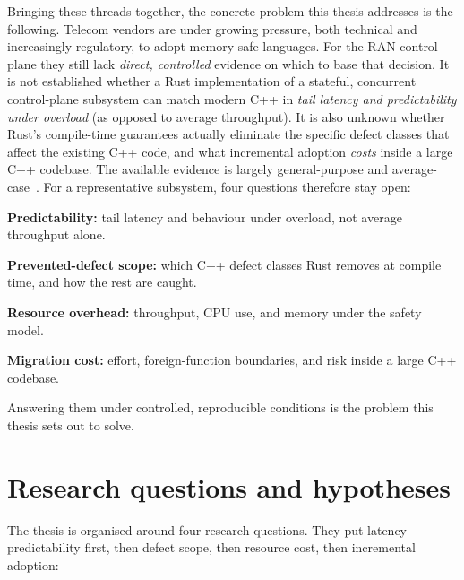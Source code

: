 \documentclass[english,oneside,a4paper,censored,csm,software-track-2020]{HYthesisML}
\begin{document}
Bringing these threads together, the concrete problem this thesis addresses is the following.
Telecom vendors are under growing pressure, both technical and increasingly regulatory, to adopt
memory-safe languages. For the RAN control plane they still lack \emph{direct, controlled}
evidence on which to base that decision. It is not established whether a Rust implementation of
a stateful, concurrent control-plane subsystem can match modern C++ in \emph{tail latency and
predictability under overload} (as opposed to average throughput). It is also unknown whether
Rust's compile-time guarantees actually eliminate the specific defect classes that affect the
existing C++ code, and what incremental adoption \emph{costs} inside a large C++ codebase. The
available evidence is largely general-purpose and
average-case~\cite{balasubramanian2017rust,qin2020rust}. For a representative subsystem,
four questions therefore stay open:
\begin{compactitem}
\item \textbf{Predictability:} tail latency and behaviour under overload, not average
throughput alone.
\item \textbf{Prevented-defect scope:} which C++ defect classes Rust removes at compile time,
and how the rest are caught.
\item \textbf{Resource overhead:} throughput, CPU use, and memory under the safety model.
\item \textbf{Migration cost:} effort, foreign-function boundaries, and risk inside a large
C++ codebase.
\end{compactitem}
Answering them under controlled, reproducible conditions is the problem this thesis sets out
to solve.

\section{Research questions and hypotheses}\label{sec:rqs}
The thesis is organised around four research questions. They put latency predictability
first, then defect scope, then resource cost, then incremental adoption:
\end{document}
